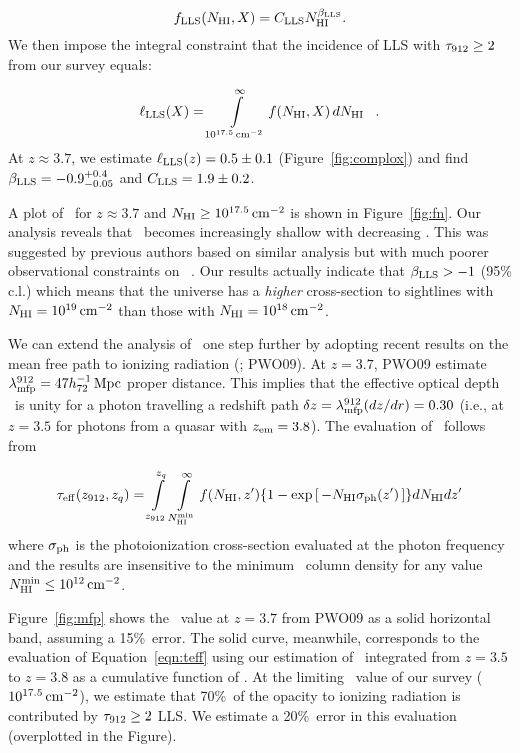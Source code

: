 \documentclass[12pt,preprint]{aastex}
\begin{document}
\begin{equation}
f_{\rm LLS}(N_{\rm HI},X) = C_{\rm LLS} N_{\rm HI}^{\beta_{\rm LLS}}.
\end{equation}
We then impose the integral constraint that 
the incidence of LLS with $\tau_{\rm 912} \ge 2$ from our survey equals:

\begin{equation}
\ell_{\rm LLS} (X) = \int\limits_{10^{17.5} \, {\rm cm^{-2}}}^\infty f(N_{\rm HI},X) \, dN_{\rm HI} \;\;\; .
\end{equation}
At $z \approx 3.7$, we estimate $\ell_{\rm{LLS}}(z) = 0.5 \pm 0.1$ (Figure~\ref{fig:complox})
and find $\beta_{\rm LLS} = -0.9^{+0.4}_{-0.05}$ and $C_{\rm LLS} = 1.9 \pm 0.2$. 

A plot of \fnhi\ for $z \approx 3.7$ and $N_{\rm HI} \ge 10^{17.5} \, {\rm cm^{-2}}$
is shown in Figure~\ref{fig:fn}.
Our analysis reveals that \fnhi\ becomes increasingly shallow
with decreasing \nhi. This was suggested by previous authors
based on similar analysis but with much poorer observational
constraints on \llls\ \citep{phw05,opb+07}.
Our results actually indicate that $\beta_{\rm LLS} > -1$ (95$\%$ c.l.)
which means that the universe has a {\it higher} cross-section to 
sightlines with $N_{\rm HI} = 10^{19} \, {\rm cm^{-2}}$ than those 
with $N_{\rm HI} = 10^{18} \, {\rm cm^{-2}}$.

We can extend the analysis of \fnhi\ one step further by adopting
recent results on the mean free path to ionizing radiation
(\lmfp; PWO09).  At $z=3.7$, PWO09 estimate 
$\lambda_{\rm mfp}^{912} = 47 h^{-1}_{72} \, \rm Mpc$ proper distance.
This implies that the effective optical depth \teff\ is unity 
for a photon travelling a redshift path
$\delta z = \lambda_{\rm mfp}^{912} (dz/dr) = 0.30$ (i.e.,  at $z=3.5$ for photons
from a quasar with $z_{\rm em} = 3.8$).
The evaluation of \teff\ follows from


\begin{equation}
\tau_{\rm eff}(z_{912},z_q) = \int\limits_{z_{912}}^{z_q} \int\limits_{N_{\rm HI}^{\rm min}}^\infty f(N_{\rm HI},z')
   \lbrace 1 - \exp \left [ \, - N_{\rm HI} \sigma_{\rm ph}(z') \, \right ] \rbrace dN_{\rm HI} dz' 
\label{eqn:teff}
\end{equation}
where $\sigma_{\rm ph}$ is the photoionization cross-section evaluated
at the photon frequency and the results are insensitive to the
minimum \nhi\ column density for any value 
$N_{\rm HI}^{\rm min} \le 10^{12} \, {\rm cm^{-2}}$.

Figure~\ref{fig:mfp} shows the \lmfp\ value at $z=3.7$ from PWO09
as a solid horizontal band, assuming a 15\%\ error. 
The solid curve, meanwhile, corresponds to the evaluation of
Equation~\ref{eqn:teff} using our estimation of \fnhi\ integrated
from $z=3.5$ to $z=3.8$ as a cumulative function of \nmin.
At the limiting \nhi\ value of our survey ($10^{17.5} \, {\rm cm^{-2}}$), 
we estimate that 70\%\ of the opacity to ionizing radiation is
contributed by $\tau_{\rm 912} \ge 2$ LLS.  We estimate a 20\%\
error in this evaluation (overplotted in the Figure).
\end{document}
